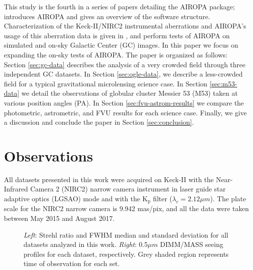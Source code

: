 \documentclass[]{spie}  %
\begin{document}
\indent This study is the fourth in a series of papers detailing the AIROPA package; \cite{witzel:2016a} introduces AIROPA and gives an overview of the software structure. Characterization of the Keck-II/NIRC2 instrumental aberrations and AIROPA's usage of this aberration data is given in \cite{Ciurlo:inprep}, and \cite{Turri:inprep} perform tests of AIROPA on simulated and on-sky Galactic Center (GC) images. In this paper we focus on expanding the on-sky tests of AIROPA. The paper is organized as follows: Section \ref{sec:gc-data} describes the analysis of a very crowded field through three independent GC datasets. In Section \ref{sec:ogle-data}, we describe a less-crowded field for a typical gravitational microlensing science case. In Section \ref{sec:m53-data} we detail the observations of globular cluster Messier 53 (M53) taken at various position angles (PA). In Section \ref{sec:fvu-astrom-results} we compare the photometric, astrometric, and FVU results for each science case. Finally, we give a discussion and conclude the paper in Section \ref{sec:conclusion}.


\section{Observations} \label{sec:observations}
All datasets presented in this work were acquired on Keck-II with the Near-Infrared Camera 2 (NIRC2) narrow camera instrument in laser guide star adaptive optics (LGSAO) mode and with the K$_\textrm{p}$ filter ($\lambda_{c} = 2.12 \mu m$). The plate scale for the NIRC2 narrow camera is 9.942 mas/pix, and all the data were taken between May 2015 and August 2017.

\begin{figure}[!htb]
 \caption{\footnotesize \textit{Left}: Strehl ratio and FWHM median and standard deviation for all datasets analyzed in this work. \textit{Right}: 0.5$\mu m$ DIMM/MASS seeing profiles for each dataset, respectively. Grey shaded region represents time of observation for each set. \label{fig:dimmmass_datasets}}
\end{figure}
\end{document}
